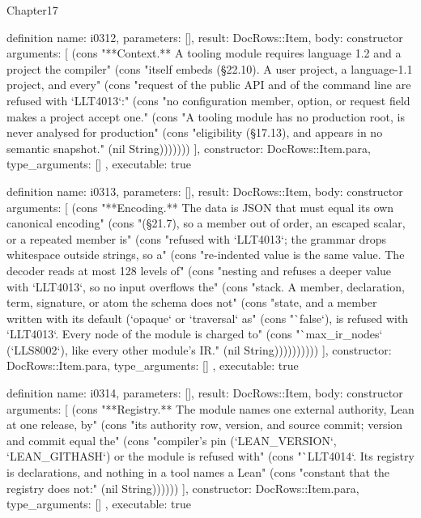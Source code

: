 \begin{lexlean}{Chapter17}
\begin{semanticmodule}
definition{
  name: i0312,
  parameters: [],
  result: DocRows::Item,
  body: constructor{
    arguments: [
      (cons "**Context.** A tooling module requires language 1.2 and a project the compiler" (cons "itself embeds (§22.10). A user project, a language-1.1 project, and every" (cons "request of the public API and of the command line are refused with `LLT4013`:" (cons "no configuration member, option, or request field makes a project accept one." (cons "A tooling module has no production root, is never analysed for production" (cons "eligibility (§17.13), and appears in no semantic snapshot." (nil String)))))))
    ],
    constructor: DocRows::Item.para,
    type_arguments: []
  },
  executable: true
}

definition{
  name: i0313,
  parameters: [],
  result: DocRows::Item,
  body: constructor{
    arguments: [
      (cons "**Encoding.** The data is JSON that must equal its own canonical encoding" (cons "(§21.7), so a member out of order, an escaped scalar, or a repeated member is" (cons "refused with `LLT4013`; the grammar drops whitespace outside strings, so a" (cons "re-indented value is the same value. The decoder reads at most 128 levels of" (cons "nesting and refuses a deeper value with `LLT4013`, so no input overflows the" (cons "stack. A member, declaration, term, signature, or atom the schema does not" (cons "state, and a member written with its default (`opaque` or `traversal` as" (cons "`false`), is refused with `LLT4013`. Every node of the module is charged to" (cons "`max_ir_nodes` (`LLS8002`), like every other module's IR." (nil String))))))))))
    ],
    constructor: DocRows::Item.para,
    type_arguments: []
  },
  executable: true
}

definition{
  name: i0314,
  parameters: [],
  result: DocRows::Item,
  body: constructor{
    arguments: [
      (cons "**Registry.** The module names one external authority, Lean at one release, by" (cons "its authority row, version, and source commit; version and commit equal the" (cons "compiler's pin (`LEAN_VERSION`, `LEAN_GITHASH`) or the module is refused with" (cons "`LLT4014`. Its registry is declarations, and nothing in a tool names a Lean" (cons "constant that the registry does not:" (nil String))))))
    ],
    constructor: DocRows::Item.para,
    type_arguments: []
  },
  executable: true
}


\end{semanticmodule}
\end{lexlean}
